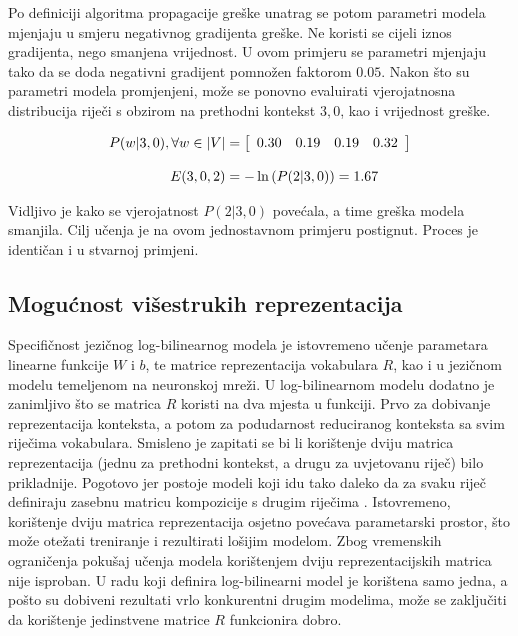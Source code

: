 \documentclass[times, utf8, diplomski, numeric]{fer}
\begin{document}
Po definiciji algoritma propagacije greške unatrag se potom parametri modela mjenjaju u smjeru negativnog gradijenta greške. Ne koristi se cijeli iznos gradijenta, nego smanjena vrijednost. U ovom primjeru se parametri mjenjaju tako da se doda negativni gradijent pomnožen faktorom $0.05$. Nakon što su parametri modela promjenjeni, može se ponovno evaluirati vjerojatnosna distribucija riječi s obzirom na prethodni kontekst $3, 0$, kao i vrijednost greške.

\begin{equation*}
\setlength{\jot}{12pt}
\begin{split}
P(w | 3, 0), \forall w \in |V| & =
\left[ \begin{array}{cccc} 0.30 & 0.19 & 0.19 & 0.32 \end{array} \right] \\
E(3, 0, 2) & = - \ln \left( P(2 | 3, 0) \right) = 1.67
\end{split}
\end{equation*}

Vidljivo je kako se vjerojatnost $P(2 | 3, 0)$ povećala, a time greška modela smanjila. Cilj učenja je na ovom jednostavnom primjeru postignut. Proces je identičan i u stvarnoj primjeni.

\subsection{Mogućnost višestrukih reprezentacija}

Specifičnost jezičnog log-bilinearnog modela je istovremeno učenje parametara linearne funkcije $W$ i $b$, te matrice reprezentacija vokabulara $R$, kao i u jezičnom modelu temeljenom na neuronskoj mreži. U log-bilinearnom modelu dodatno je zanimljivo što se matrica $R$ koristi na dva mjesta u funkciji. Prvo za dobivanje reprezentacija konteksta, a potom za podudarnost reduciranog konteksta sa svim riječima vokabulara. Smisleno je zapitati se bi li korištenje dviju matrica reprezentacija (jednu za prethodni kontekst, a drugu za uvjetovanu riječ) bilo prikladnije. Pogotovo jer postoje modeli koji idu tako daleko da za svaku riječ definiraju zasebnu matricu kompozicije s drugim riječima \cite{SocherEtAl2012:MVRNN}. Istovremeno, korištenje dviju matrica reprezentacija osjetno povećava parametarski prostor, što može otežati treniranje i rezultirati lošijim modelom. Zbog vremenskih ograničenja pokušaj učenja modela korištenjem dviju reprezentacijskih matrica nije isproban. U radu koji definira log-bilinearni model \cite{MnihH07} je korištena samo jedna, a pošto su dobiveni rezultati vrlo konkurentni drugim modelima, može se zaključiti da korištenje jedinstvene matrice $R$ funkcionira dobro.
\end{document}
